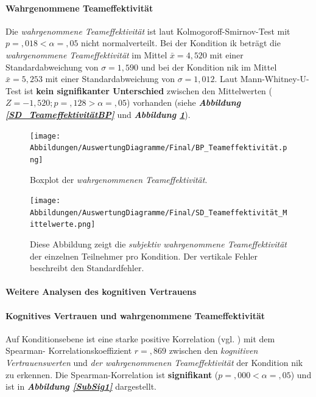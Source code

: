 \documentclass[a4paper,11pt]{article}%
\renewcommand{\\}{\vspace*{0.5\baselineskip} \newline}
\begin{document}
{\newpage

\paragraph{Wahrgenommene Teameffektivität}
Die \textit{wahrgenommene Teameffektivität} ist laut Kolmogoroff-Smirnov-Test mit $p =,018 < \alpha = ,05$ nicht normalverteilt. 
Bei der Kondition \ac{ik} beträgt die \textit{wahrgenommene Teameffektivität} im Mittel $\bar{x} = 4,520$ mit einer Standardabweichung von $\sigma = 1,590$ und bei der Kondition \ac{nik} im Mittel $\bar{x} = 5,253$ mit einer Standardabweichung von $\sigma = 1,012$. 
Laut Mann-Whitney-U-Test ist \textbf{kein signifikanter Unterschied} zwischen den Mittelwerten ($ Z = -1,520; p =,128 > \alpha = ,05$) vorhanden  (siehe \textbf{\textit{Abbildung \ref{SD_TeameffektivitätBP}}} und \textbf{\textit{Abbildung \ref{SD_Teameffektivität_Mittelwerte}}}).

		\begin{figure}[H]
   \begin{minipage}[t]{.5\linewidth} %
      \texttt{[image: Abbildungen/AuswertungDiagramme/Final/BP\_Teameffektivität.png]}
      \caption[Boxplot der wahrgenommenen Teameffektivität]{Boxplot der \textit{wahrgenommenen Teameffektivität}.}
            \label{SD_TeameffektivitätBP}
   \end{minipage}
   \hspace{.02\linewidth}%
   \begin{minipage}[t]{.5\linewidth} %
     \texttt{[image: Abbildungen/AuswertungDiagramme/Final/SD\_Teameffektivität\_Mittelwerte.png]}
      \caption[Durchschnittlich wahrgenommene Teameffektivität]{Diese Abbildung zeigt die \textit{subjektiv wahrgenommene Teameffektivität} der einzelnen Teilnehmer pro Kondition. Der vertikale Fehler beschreibt den Standardfehler.}
       \label{SD_Teameffektivität_Mittelwerte}
   \end{minipage}
\end{figure}

\newpage
\paragraph{Weitere Analysen des kognitiven Vertrauens}
\label{Weiter Analysen}
\paragraph{Kognitives Vertrauen und wahrgenommene Teameffektivität}
Auf Konditionsebene ist eine starke positive Korrelation (vgl. \citep{cohen2013statistical}) mit dem Spearman- Korrelationskoeffizient $r =,869$ zwischen den \textit{kognitiven Vertrauenswerten} und \textit{der wahrgenommenen Teameffektivität} der Kondition \ac{nik} zu erkennen. Die Spearman-Korrelation ist \textbf{signifikant} ($p =,000 < \alpha = ,05$) und ist in \textbf{\textit{Abbildung \ref{SubSig1}}} dargestellt.\\

}
\end{document}
